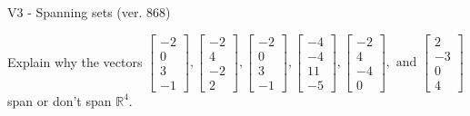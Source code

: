 \begin{exercise}
  \begin{exerciseTitle}V3 - Spanning sets (ver. 868)\end{exerciseTitle}
  \begin{exerciseStatement}
    Explain why the vectors \(\left[\begin{array}{r}
-2 \\
0 \\
3 \\
-1
\end{array}\right] , \left[\begin{array}{r}
-2 \\
4 \\
-2 \\
2
\end{array}\right] , \left[\begin{array}{r}
-2 \\
0 \\
3 \\
-1
\end{array}\right] , \left[\begin{array}{r}
-4 \\
-4 \\
11 \\
-5
\end{array}\right] , \left[\begin{array}{r}
-2 \\
4 \\
-4 \\
0
\end{array}\right] , \text{ and } \left[\begin{array}{r}
2 \\
-3 \\
0 \\
4
\end{array}\right]\) span or don't span \(\mathbb{R}^4\). 
	



\end{exerciseStatement}
\end{exercise}
